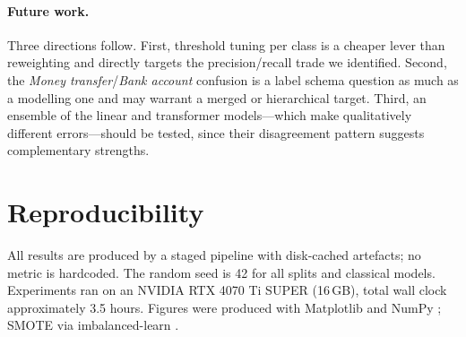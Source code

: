 \documentclass[11pt]{article}
\begin{document}
\paragraph{Future work.}
Three directions follow. First, threshold tuning per class is a cheaper lever
than reweighting and directly targets the precision/recall trade we identified.
Second, the \textit{Money transfer}/\textit{Bank account} confusion is a label
schema question as much as a modelling one and may warrant a merged or
hierarchical target. Third, an ensemble of the linear and transformer
models---which make qualitatively different errors---should be tested, since
their disagreement pattern suggests complementary strengths.

\section*{Reproducibility}

All results are produced by a staged pipeline with disk-cached artefacts;
no metric is hardcoded. The random seed is 42 for all splits and classical
models. Experiments ran on an NVIDIA RTX 4070 Ti SUPER (16\,GB), total wall
clock approximately 3.5 hours. Figures were produced with Matplotlib
\cite{hunter2007matplotlib} and NumPy \cite{harris2020array}; SMOTE via
imbalanced-learn \cite{lemaitre2017imbalanced}.




\appendix

\end{document}
